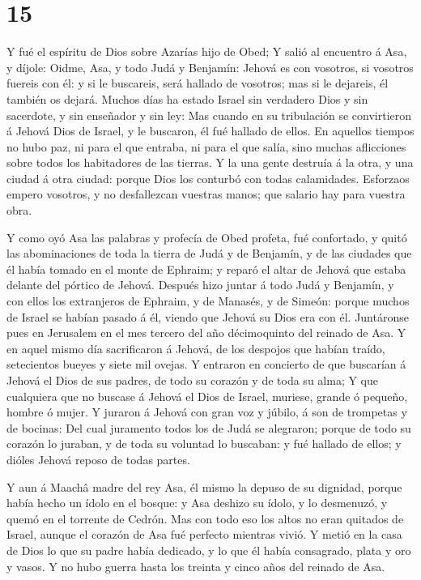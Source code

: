 \hypertarget{section-14}{%
\section{15}\label{section-14}}

 Y fué el espíritu de Dios sobre Azarías hijo de Obed;
 Y salió al encuentro á Asa, y díjole: Oidme, Asa, y todo
Judá y Benjamín: Jehová es con vosotros, si vosotros fuereis con él: y
si le buscareis, será hallado de vosotros; mas si le dejareis, él
también os dejará.  Muchos días ha estado Israel sin
verdadero Dios y sin sacerdote, y sin enseñador y sin ley: 
Mas cuando en su tribulación se convirtieron á Jehová Dios de Israel, y
le buscaron, él fué hallado de ellos.  En aquellos tiempos
no hubo paz, ni para el que entraba, ni para el que salía, sino muchas
aflicciones sobre todos los habitadores de las tierras.  Y
la una gente destruía á la otra, y una ciudad á otra ciudad: porque Dios
los conturbó con todas calamidades.  Esforzaos empero
vosotros, y no desfallezcan vuestras manos; que salario hay para vuestra
obra.

 Y como oyó Asa las palabras y profecía de Obed profeta, fué
confortado, y quitó las abominaciones de toda la tierra de Judá y de
Benjamín, y de las ciudades que él había tomado en el monte de Ephraim;
y reparó el altar de Jehová que estaba delante del pórtico de Jehová.
 Después hizo juntar á todo Judá y Benjamín, y con ellos los
extranjeros de Ephraim, y de Manasés, y de Simeón: porque muchos de
Israel se habían pasado á él, viendo que Jehová su Dios era con él.
 Juntáronse pues en Jerusalem en el mes tercero del año
décimoquinto del reinado de Asa.  Y en aquel mismo día
sacrificaron á Jehová, de los despojos que habían traído, setecientos
bueyes y siete mil ovejas.  Y entraron en concierto de que
buscarían á Jehová el Dios de sus padres, de todo su corazón y de toda
su alma;  Y que cualquiera que no buscase á Jehová el Dios
de Israel, muriese, grande ó pequeño, hombre ó mujer.  Y
juraron á Jehová con gran voz y júbilo, á son de trompetas y de bocinas:
 Del cual juramento todos los de Judá se alegraron; porque
de todo su corazón lo juraban, y de toda su voluntad lo buscaban: y fué
hallado de ellos; y dióles Jehová reposo de todas partes.

 Y aun á Maachâ madre del rey Asa, él mismo la depuso de su
dignidad, porque había hecho un ídolo en el bosque: y Asa deshizo su
ídolo, y lo desmenuzó, y quemó en el torrente de Cedrón. 
Mas con todo eso los altos no eran quitados de Israel, aunque el corazón
de Asa fué perfecto mientras vivió.  Y metió en la casa de
Dios lo que su padre había dedicado, y lo que él había consagrado, plata
y oro y vasos.  Y no hubo guerra hasta los treinta y cinco
años del reinado de Asa.

